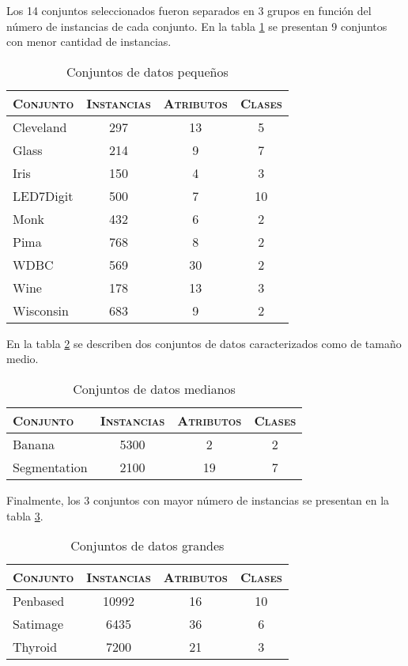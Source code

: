 Los 14 conjuntos seleccionados fueron separados en 3 grupos en función del número de instancias de cada conjunto. En la tabla \ref{data-small} se presentan 9 conjuntos con menor cantidad de instancias.

\begin{table}[h!]
\centering
\begin{tabular}{l c c c}
\hline
\textsc{Conjunto} & \textsc{Instancias} & \textsc{Atributos} & \textsc{Clases} \\
\hline
\hline
Cleveland & 297 & 13 &  5 \\
Glass     & 214 &  9 &  7 \\
Iris      & 150 &  4 &  3 \\
LED7Digit & 500 &  7 & 10 \\
Monk      & 432 &  6 &  2 \\
Pima      & 768 &  8 &  2 \\
WDBC      & 569 & 30 &  2 \\
Wine      & 178 & 13 &  3 \\
Wisconsin & 683 &  9 &  2 \\
\hline
\end{tabular}
\caption{Conjuntos de datos pequeños}
\label{data-small}
\end{table}

En la tabla \ref{data-med} se describen dos conjuntos de datos caracterizados como de tamaño medio.

\begin{table}[h!]
\centering
\begin{tabular}{l c c c}
\hline
\textsc{Conjunto} & \textsc{Instancias} & \textsc{Atributos} & \textsc{Clases} \\
\hline
\hline
Banana       &  5300 &  2 &  2 \\
Segmentation &  2100 & 19 &  7 \\
\hline
\end{tabular}
\caption{Conjuntos de datos medianos}
\label{data-med}
\end{table}

Finalmente, los 3 conjuntos con mayor número de instancias se presentan en la tabla \ref{data-big}.

\begin{table}[h!]
\centering
\begin{tabular}{l c c c}
\hline
\textsc{Conjunto} & \textsc{Instancias} & \textsc{Atributos} & \textsc{Clases} \\
\hline
\hline
Penbased    & 10992 & 16 & 10 \\
Satimage     &  6435 & 36 &  6 \\
Thyroid      &  7200 & 21 &  3 \\
\hline
\end{tabular}
\caption{Conjuntos de datos grandes}
\label{data-big}
\end{table}

